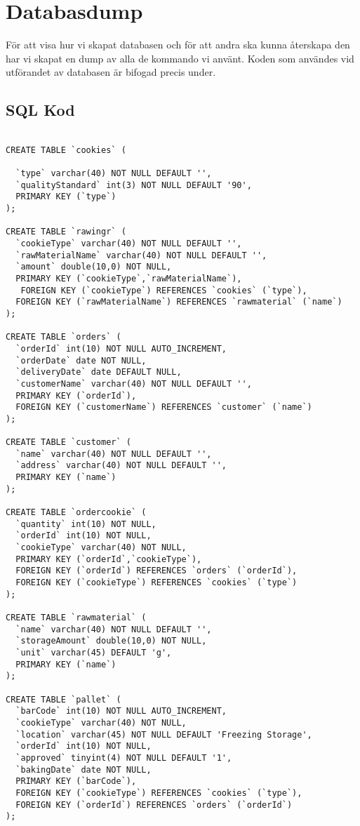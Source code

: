 

\section{Databasdump}

För att visa hur vi skapat databasen och för att andra ska kunna återskapa den har vi skapat en dump av alla de kommando vi använt. Koden som användes vid utförandet av databasen är bifogad precis under. 

\subsection{SQL Kod}
\begin{lstlisting}

CREATE TABLE `cookies` (

  `type` varchar(40) NOT NULL DEFAULT '',
  `qualityStandard` int(3) NOT NULL DEFAULT '90',
  PRIMARY KEY (`type`)
);

CREATE TABLE `rawingr` (
  `cookieType` varchar(40) NOT NULL DEFAULT '',
  `rawMaterialName` varchar(40) NOT NULL DEFAULT '',
  `amount` double(10,0) NOT NULL,
  PRIMARY KEY (`cookieType`,`rawMaterialName`),
   FOREIGN KEY (`cookieType`) REFERENCES `cookies` (`type`),
  FOREIGN KEY (`rawMaterialName`) REFERENCES `rawmaterial` (`name`)
);

CREATE TABLE `orders` (
  `orderId` int(10) NOT NULL AUTO_INCREMENT,
  `orderDate` date NOT NULL,
  `deliveryDate` date DEFAULT NULL,
  `customerName` varchar(40) NOT NULL DEFAULT '',
  PRIMARY KEY (`orderId`),
  FOREIGN KEY (`customerName`) REFERENCES `customer` (`name`)
);

CREATE TABLE `customer` (
  `name` varchar(40) NOT NULL DEFAULT '',
  `address` varchar(40) NOT NULL DEFAULT '',
  PRIMARY KEY (`name`)
);

CREATE TABLE `ordercookie` (
  `quantity` int(10) NOT NULL,
  `orderId` int(10) NOT NULL,
  `cookieType` varchar(40) NOT NULL,
  PRIMARY KEY (`orderId`,`cookieType`),
  FOREIGN KEY (`orderId`) REFERENCES `orders` (`orderId`),
  FOREIGN KEY (`cookieType`) REFERENCES `cookies` (`type`)
);

CREATE TABLE `rawmaterial` (
  `name` varchar(40) NOT NULL DEFAULT '',
  `storageAmount` double(10,0) NOT NULL,
  `unit` varchar(45) DEFAULT 'g',
  PRIMARY KEY (`name`)
);

CREATE TABLE `pallet` (
  `barCode` int(10) NOT NULL AUTO_INCREMENT,
  `cookieType` varchar(40) NOT NULL,
  `location` varchar(45) NOT NULL DEFAULT 'Freezing Storage',
  `orderId` int(10) NOT NULL,
  `approved` tinyint(4) NOT NULL DEFAULT '1',
  `bakingDate` date NOT NULL,
  PRIMARY KEY (`barCode`),
  FOREIGN KEY (`cookieType`) REFERENCES `cookies` (`type`),
  FOREIGN KEY (`orderId`) REFERENCES `orders` (`orderId`)
);
\end{lstlisting}